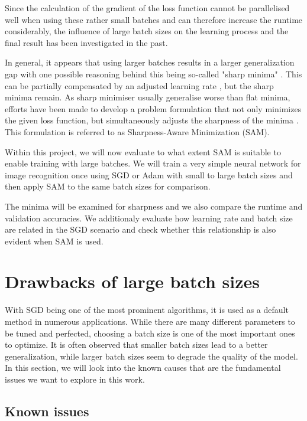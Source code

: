 \documentclass[10pt,conference,compsocconf]{IEEEtran}
\begin{document}
Since the calculation of the gradient of the loss function cannot be parallelised well when using these rather small batches and can therefore increase the runtime considerably, the influence of large batch sizes on the learning process and the final result has been investigated in the past. 

In general, it appears that using larger batches results in a larger generalization gap with one possible reasoning behind this being so-called "sharp minima" \cite{keskar2017largebatch}. This can be partially compensated by an adjusted learning rate \cite{goyal2018accurate}, but the sharp minima remain. 
As sharp minimiser usually generalise worse than flat minima, efforts have been made to develop a problem formulation that not only minimizes the given loss function, but simultaneously adjusts the sharpness of the minima \cite{foret2021sharpnessaware}. This formulation is referred to as Sharpness-Aware Minimization (SAM). 


Within this project, we will now evaluate to what extent SAM is suitable to enable training with large batches. 
We will train a very simple neural network for image recognition once using SGD or Adam with small to large batch sizes and then apply SAM to the same batch sizes for comparison. 

The minima will be examined for sharpness and we also compare the runtime and validation accuracies. 
We additionaly evaluate how learning rate and batch size are related in the SGD scenario and check whether this relationship is also evident when SAM is used. 

\section{Drawbacks of large batch sizes}
\label{sec:drawbacks-large-bs}

With SGD being one of the most prominent algorithms, it is used as a default method in numerous applications. While there are many different parameters to be tuned and perfected, choosing a batch size is one of the most important ones to optimize. It is often observed that smaller batch sizes lead to a better generalization, while larger batch sizes seem to degrade the quality of the model. In this section, we will look into the known causes that are the fundamental issues we want to explore in this work. 

\subsection{Known issues}
\label{subsec:known-issues}
\end{document}
